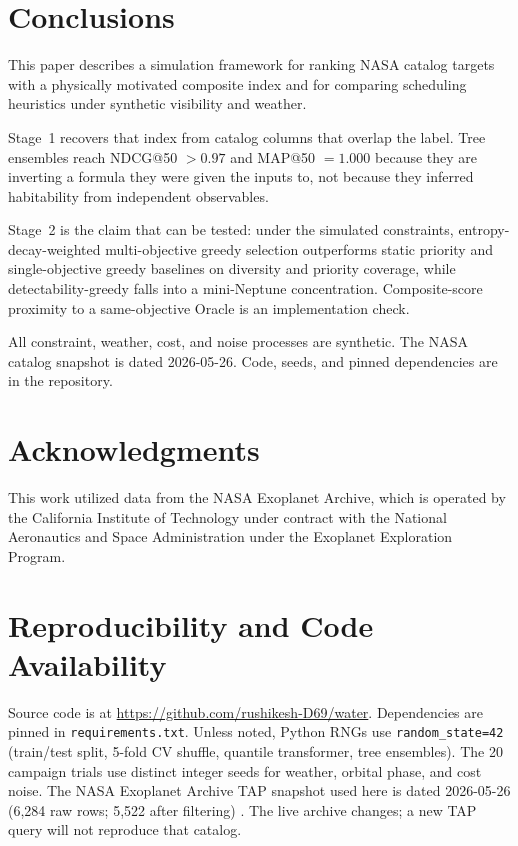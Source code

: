 \documentclass[11pt,a4paper]{article}
\begin{document}
\section{Conclusions}
\label{sec:conclusion}

This paper describes a simulation framework for ranking NASA catalog targets with a physically motivated composite index and for comparing scheduling heuristics under synthetic visibility and weather.

Stage~1 recovers that index from catalog columns that overlap the label. Tree ensembles reach NDCG@50 $> 0.97$ and MAP@50 $= 1.000$ because they are inverting a formula they were given the inputs to, not because they inferred habitability from independent observables.

Stage~2 is the claim that can be tested: under the simulated constraints, entropy-decay-weighted multi-objective greedy selection outperforms static priority and single-objective greedy baselines on diversity and priority coverage, while detectability-greedy falls into a mini-Neptune concentration. Composite-score proximity to a same-objective Oracle is an implementation check.

All constraint, weather, cost, and noise processes are synthetic. The NASA catalog snapshot is dated 2026-05-26. Code, seeds, and pinned dependencies are in the repository.

\section*{Acknowledgments}

This work utilized data from the NASA Exoplanet Archive, which is operated by the California Institute of Technology under contract with the National Aeronautics and Space Administration under the Exoplanet Exploration Program.

\section*{Reproducibility and Code Availability}

Source code is at \url{https://github.com/rushikesh-D69/water}. Dependencies are pinned in \texttt{requirements.txt}. Unless noted, Python RNGs use \texttt{random\_state=42} (train/test split, 5-fold CV shuffle, quantile transformer, tree ensembles). The 20 campaign trials use distinct integer seeds for weather, orbital phase, and cost noise. The NASA Exoplanet Archive TAP snapshot used here is dated 2026-05-26 (6{,}284 raw rows; 5{,}522 after filtering) \cite{nasa_archive}. The live archive changes; a new TAP query will not reproduce that catalog.
\end{document}
